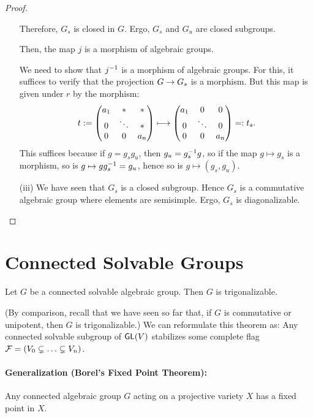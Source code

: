\begin{proof}
\begin{enumerate}
Therefore, $G_s$ is closed in $G$. Ergo, $G_s$ and $G_u$ are closed subgroups.

Then, the map $j$ is a morphism of algebraic groups.

We need to show that $j^{-1}$ is a morphism of algebraic groups. For this, it suffices to verify that the projection $G \overset{}{\rightarrow} G_s$ is a morphism. But this map is given under $r$ by the morphism:
\begin{align*}
t:={\left(\begin{matrix} a_1 & *& *\\
		0 & \ddots & *\\
		0 & 0 & a_n \end{matrix}\right)} \longmapsto{\left(\begin{matrix} a_1 & 0& 0\\
		0 & \ddots & 0\\
		0 & 0 & a_n \end{matrix}\right)} =: t_s.
\end{align*}
This suffices because if $g = g_s g_u$, then $g_u = g_s^{-1} g$, so if the map $g \mapsto g_s$ is a morphism, so is $g\mapsto gg_s^{-1} = g_u$, hence so is $g \mapsto (g_s, g_u)$.
\item[(iii)] We have seen that $G_s$ is a closed subgroup. Hence $G_s$ is a commutative algebraic group where elements are semisimple. Ergo, $G_s$ is diagonalizable.
\end{enumerate}
\end{proof}

\newpage
\section{Connected Solvable Groups}

\begin{theorem}
Let $G$ be a connected solvable algebraic group. Then $G$ is trigonalizable.
\end{theorem}
(By comparison, recall that we have seen so far that, if $G$ is commutative or unipotent, then $G$ is trigonalizable.)
We can reformulate this theorem as: Any connected solvable subgroup of $\textsf{GL}(V)$ stabilizes some complete flag $\mathcal{F} = (V_0 \subsetneq \ldots \subsetneq  V_n)$.
\paragraph{Generalization (Borel's Fixed Point Theorem):} Any connected algebraic group $G$ acting on a projective variety $X$ has a fixed point in $X$.

